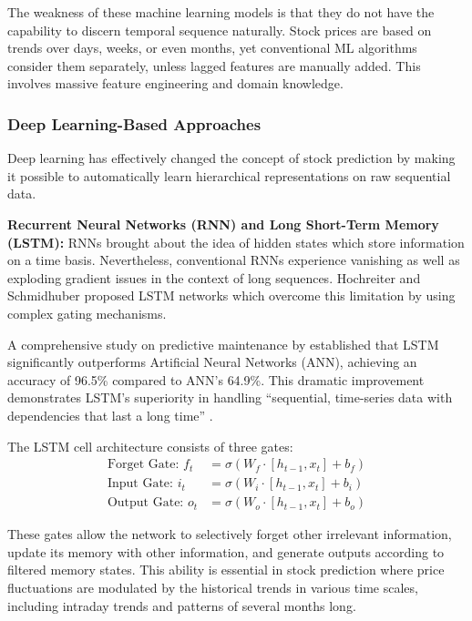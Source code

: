 The weakness of these machine learning models is that they do not have the capability to discern temporal sequence naturally. Stock prices are based on trends over days, weeks, or even months, yet conventional ML algorithms consider them separately, unless lagged features are manually added. This involves massive feature engineering and domain knowledge.

\subsubsection{Deep Learning-Based Approaches}

Deep learning has effectively changed the concept of stock prediction by making it possible to automatically learn hierarchical representations on raw sequential data.

\textbf{Recurrent Neural Networks (RNN) and Long Short-Term Memory (LSTM):}
RNNs brought about the idea of hidden states which store information on a time basis. Nevertheless, conventional RNNs experience vanishing as well as exploding gradient issues in the context of long sequences. Hochreiter and Schmidhuber proposed LSTM networks which overcome this limitation by using complex gating mechanisms.

A comprehensive study on predictive maintenance by \cite{machinefailure2024} established that LSTM significantly outperforms Artificial Neural Networks (ANN), achieving an accuracy of 96.5\% compared to ANN's 64.9\%. This dramatic improvement demonstrates LSTM's superiority in handling ``sequential, time-series data with dependencies that last a long time'' \cite{machinefailure2024}.

The LSTM cell architecture consists of three gates:
\begin{align}
\text{Forget Gate: } f_t &= \sigma(W_f \cdot [h_{t-1}, x_t] + b_f) \\
\text{Input Gate: } i_t &= \sigma(W_i \cdot [h_{t-1}, x_t] + b_i) \\
\text{Output Gate: } o_t &= \sigma(W_o \cdot [h_{t-1}, x_t] + b_o)
\end{align}

These gates allow the network to selectively forget other irrelevant information, update its memory with other information, and generate outputs according to filtered memory states. This ability is essential in stock prediction where price fluctuations are modulated by the historical trends in various time scales, including intraday trends and patterns of several months long.


